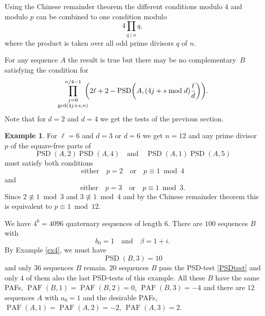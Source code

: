 \documentclass{article}
\theoremstyle{definition}
\newtheorem{example}[theorem]{Example}
\newcommand{\PAF}{\operatorname{PAF}}
\newcommand{\DFT}{\operatorname{DFT}}
\newcommand{\PSD}{\operatorname{PSD}}
\begin{document}
Using the Chinese remainder theorem the different conditions modulo $4$ and modulo $p$ can be combined to one condition modulo
$$4\prod\limits_{q\mid n}q,$$ 
where the product is taken over all odd prime divisors $q$ of $n$.


For any sequence $A$ the result is true but there may be no complementary~$B$ satisfying the condition for
$$\prod_{\textstyle\genfrac{}{}{0pt}{}{j=0}{\gcd(4j+s,n)}}^{n/4-1}\kern-8pt\left(2\ell+2-\PSD\biggl(A,(4j+s\bmod d)\frac{\ell}{d}\right)\biggr).$$
Note that for $d=2$ and $d=4$ we get the tests of the previous section.\\

\begin{example}
For $\ell=6$ and $d=3$ or $d=6$ we get $n=12$ and any prime divisor~$p$ of the square-free parts of
$$\PSD(A,2)\PSD(A,4)\quad \mbox{and}\quad \PSD(A,1)\PSD(A,5)$$
must satisfy both conditions
$$\mbox{either} \quad p=2\quad\mbox{or}\quad p\equiv 1\bmod 4$$
and 
$$\mbox{either} \quad p=3\quad\mbox{or}\quad p\equiv 1\bmod 3.$$
Since $2\not\equiv 1\bmod 3$ and $3\not\equiv 1\bmod 4$ and by the Chinese remainder theorem this is equivalent to 
$p\equiv 1\bmod 12$.

We have $4^6=4096$ quaternary sequences of length $6$. There are %
$100$ sequences $B$ with 
$$b_0=1\quad\mbox{and}\quad\beta=1+i.$$ By Example \ref{ex4}, we must have %
$$\PSD(B,3)=10$$ and only %
$36$ sequences $B$ remain. 
$20$ sequences $B$ pass the PSD-test \eqref{PSDtest}
and only $4$ of them also the last PSD-tests of this example.
All these $B$ have the same PAFs, $\PAF(B,1)=\PAF(B,2)=0$, $\PAF(B,3)=-4$ and there are $12$ sequences $A$ with $a_0=1$ and the desirable PAFs,
$\PAF(A,1)=\PAF(A,2)=-2$, $\PAF(A,3)=2$. 
\end{example}

\end{document}
